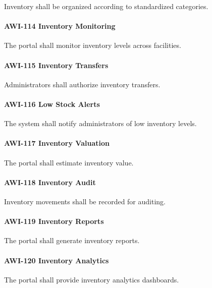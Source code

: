 Inventory shall be organized according to standardized categories.

\paragraph{AWI-114 Inventory Monitoring}

The portal shall monitor inventory levels across facilities.

\paragraph{AWI-115 Inventory Transfers}

Administrators shall authorize inventory transfers.

\paragraph{AWI-116 Low Stock Alerts}

The system shall notify administrators of low inventory levels.

\paragraph{AWI-117 Inventory Valuation}

The portal shall estimate inventory value.

\paragraph{AWI-118 Inventory Audit}

Inventory movements shall be recorded for auditing.

\paragraph{AWI-119 Inventory Reports}

The portal shall generate inventory reports.

\paragraph{AWI-120 Inventory Analytics}

The portal shall provide inventory analytics dashboards.


